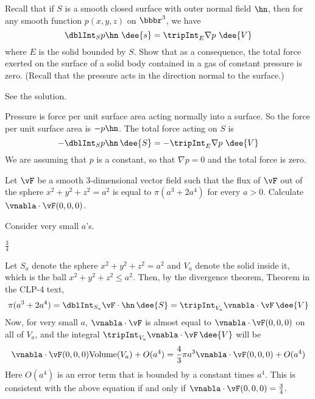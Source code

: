 \begin{question}[M317 2004A] %
Recall that if $S$ is a smooth closed surface with outer
normal field $\hn$, then for any smooth function $p(x,y,z)$ on $\bbbr^3$,
we have
\begin{equation*}
\dblInt_S p\hn\ \dee{s}=\tripInt_E \nabla p\ \dee{V}
\end{equation*}
where $E$ is the solid bounded by $S$. Show that as a consequence,
the total force exerted on the surface of a solid body contained in a gas
of constant pressure is zero. (Recall that the pressure acts in the direction
normal to the surface.)
\end{question}


\begin{answer} 
See the solution.
\end{answer}

\begin{solution} 
Pressure is force per unit surface area acting normally into
a surface. So the force per unit surface area is $-p\hn$. The total force
acting on $S$ is
\begin{equation*}
-\dblInt_S p\hn\,\dee{S}=-\tripInt_E \nabla p\ \dee{V}
\end{equation*}
We are assuming that $p$ is a constant, so that $\nabla p=0$ and the 
total force is zero.
\end{solution}

\begin{question}[M317 2002A] %
Let $\vF$ be a smooth 3-dimensional
vector field such that the flux of $\vF$ out of the sphere $x^2+y^2+z^2=a^2$
is equal to $\pi(a^3+2a^4)$ for every $a>0$. 
Calculate $\vnabla\cdot \vF(0,0,0)$.
\end{question}

\begin{hint} 
Consider very small $a$'s.
\end{hint}

\begin{answer} 
$\frac{3}{4}$
\end{answer}

\begin{solution} 
Let $S_a$ denote the sphere $x^2+y^2+z^2=a^2$
and $V_a$ denote the solid inside it, which is the ball 
$x^2+y^2+z^2\le a^2$. Then, by the divergence theorem, 
Theorem  in the CLP-4 text,
$$
\pi(a^3+2a^4)
=\dblInt_{S_a}\vF\cdot\hn\,\dee{S}
=\tripInt_{V_a}\vnabla\cdot\vF\,\dee{V}
$$
Now, for very small $a$, $\vnabla\cdot\vF$ is almost equal to 
$\vnabla\cdot\vF(0,0,0)$ on all of $V_a$, and
the integral  $\tripInt_{V_a}\vnabla\cdot\vF\,\dee{V}$
will be 
$$
\vnabla\cdot\vF(0,0,0){\rm Volume}(V_a)+O(a^4)
=\frac{4}{3}\pi a^3\vnabla\cdot\vF(0,0,0)+O(a^4)
$$
Here $O(a^4)$ is an error term that is bounded by a constant times $a^4$.
This is consistent with the above equation if and only if
$\vnabla\cdot\vF(0,0,0)=\frac{3}{4}$.
\end{solution}


